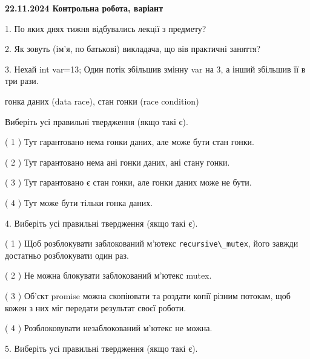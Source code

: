 \documentclass[12pt, ukrainian]{article}
\def\code#1{\Verb!#1!}
\begin{document}
\vspace{4mm}
\newpage
\begin {large}

\textbf{22.11.2024 Контрольна робота, варіант  }\par


{
1. По яких днях тижня відбувались лекції з предмету?



\vspace{5mm}
2. Як зовуть (ім'я, по батькові) викладача, що вів практичні заняття?



\vspace{5mm}
3. Нехай int var=13; Один потік збільшив змінну var на 3, а інший збільшив її в три рази.

гонка даних (data race), стан гонки (race condition)

Виберіть усі правильні твердження (якщо такі є).\par
\vspace{2mm}
( 1 ) Тут гарантовано нема гонки даних, але може бути стан гонки.%

( 2 ) Тут гарантовано нема ані гонки даних, ані стану гонки.%

( 3 ) Тут гарантовано є стан гонки, але гонки даних може не бути.%

( 4 ) Тут може бути тільки гонка даних.%


\vspace{5mm}
4. Виберіть усі правильні твердження (якщо такі є).\par
\vspace{2mm}

( 1 ) Щоб розблокувати заблокований м’ютекс \code{recursive\_mutex}, його завжди достатньо розблокувати один раз.%

( 2 ) Не можна блокувати заблокований м’ютекс mutex.%

( 3 ) Об’єкт promise можна скопіювати та роздати копії різним потокам, щоб кожен з них міг передати результат своєї роботи.%

( 4 ) Розблоковувати незаблокований м’ютекс не можна.%


\vspace{5mm}
5. Виберіть усі правильні твердження (якщо такі є).\par
\vspace{2mm}

}
\end{large}
\end{document}
